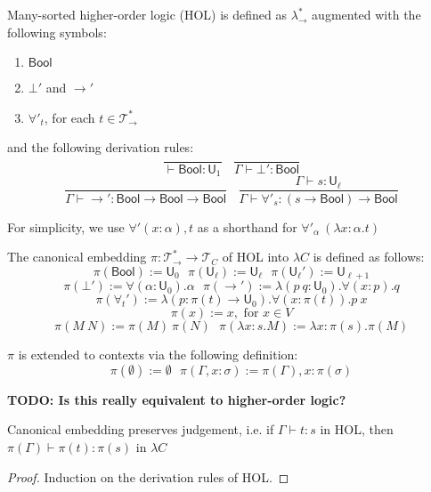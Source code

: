 \begin{definition} Many-sorted higher-order logic (HOL) is defined as $\lambda_\to^*$ augmented
  with the following symbols:
  \begin{enumerate}
    \item $\mathsf{Bool}$
    \item $\bot'$ and $\to'$
    \item $\forall'_t$, for each $t \in \mathcal{T}_\to^*$
  \end{enumerate}
  
  \noindent and the following derivation rules:
  $$\frac{}{\vdash \mathsf{Bool} : \mathsf{U}_1} \ \ \ \ \frac{}{\Gamma \vdash \bot' : \mathsf{Bool}}$$
  $$\frac{}{\Gamma \vdash \to' : \mathsf{Bool} \to \mathsf{Bool} \to \mathsf{Bool}} \ \ \ \
  \frac{\Gamma \vdash s : \mathsf{U}_\ell}{\Gamma \vdash \forall'_s : (s \to \mathsf{Bool}) \to \mathsf{Bool}}$$
  
  \noindent For simplicity, we use $\forall' (x : \alpha), t$ as a shorthand for $\forall'_\alpha \ (\lambda x : \alpha. t)$

  The canonical embedding $\pi : \mathcal{T}_\to^* \to \mathcal{T}_C$ of HOL into $\lambda C$ is defined as follows:
  $$\pi(\mathsf{Bool}) := \mathsf{U}_0 \ \ \ \pi(\mathsf{U}_\ell) := \mathsf{U}_\ell \ \ \
    \pi(\mathsf{U}_\ell') := \mathsf{U}_{\ell + 1}$$
  $$\pi(\bot') := \forall (\alpha : \mathsf{U}_0). \alpha \ \ \
  \pi(\to') := \lambda (p \ q : \mathsf{U}_0). \forall (x : p). q$$
  $$\pi(\forall_t') := \lambda (p : \pi(t) \to \mathsf{U}_0). \forall (x : \pi(t)). p \ x$$
  $$\pi(x) := x, \text{ for } x \in V$$
  $$\pi(M \ N) := \pi(M) \ \pi(N) \ \ \ \pi(\lambda x : s. M) := \lambda x : \pi(s). \pi(M)$$

  \noindent $\pi$ is extended to contexts via the following definition:
  $$\pi(\emptyset) := \emptyset \ \ \ \pi(\Gamma, x : \sigma) := \pi(\Gamma), x : \pi(\sigma)$$

  \noindent \textbf{TODO: Is this really equivalent to higher-order logic?}

\end{definition}

\begin{theorem}\label{ceptj} Canonical embedding preserves judgement, i.e. if $\Gamma \vdash t : s$ in HOL, then
  $\pi(\Gamma) \vdash \pi(t) : \pi(s)$ in $\lambda C$ \end{theorem}
\begin{proof} Induction on the derivation rules of HOL. \end{proof}

